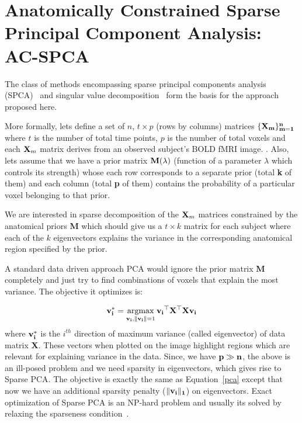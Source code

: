 \documentclass{llncs}
\newcommand{\argmax}{\operatornamewithlimits{argmax}}
\begin{document}





\section{ Anatomically Constrained Sparse Principal Component Analysis: AC-SPCA}
The class of methods encompassing sparse principal components analysis (SPCA)~\cite{zou2006sparse,Witten2009b,d2007direct} and singular value decomposition~\cite{sill2011robust} form the basis for the approach proposed here. 


More formally, lets define a set of $n$, $t\times p$ (rows by columns) matrices $\{\bf X_m\}_{m=1}^n$ where $t$ is the number of total time points, $p$ is the number of total voxels and each ${\bf X}_m$ matrix derives from an observed subject's BOLD fMRI image. .
Also, lets assume that we have a prior matrix {$\bf M(\lambda)$} (function of a parameter $\lambda$ which controls its strength) whose each row corresponds to a separate prior (total {\bf k} of them) and each column (total {\bf p} of them) contains the probability of a particular voxel belonging to that prior. 


We are interested in sparse decomposition of the ${\bf X}_m$ matrices constrained by the anatomical priors {\bf M} which should give us a $t \times k$ matrix for each subject where each of the $k$ eigenvectors explains the variance in the corresponding anatomical region specified by the prior.


A standard data driven approach PCA would ignore the prior matrix {\bf M} completely and just try to find combinations of voxels that explain the most variance. The objective it optimizes is:

\begin{equation}
{\bf v_i^*}= \argmax_{{\bf v_i},{\bf \|v_i\|}=1} {\bf v_i}^{\top}{\bf X^{\top}X}{\bf v_i}
\label{pca}
\end{equation}
where {$\bf v_i^*$} is the $i^{th}$ direction of maximum variance (called eigenvector) of data matrix {\bf X}. These vectors when plotted on the image highlight regions which are
relevant for explaining variance in the data. Since, we have ${\bf p \gg n}$, the above is an ill-posed problem and we need sparsity in eigenvectors, which gives rise to Sparse PCA. The objective is exactly the same as Equation~\ref{pca} except that now we have an additional sparsity penalty ($\|\bf v _i\|_1$) on eigenvectors.  Exact optimization of Sparse PCA is an NP-hard problem and usually its solved by relaxing the sparseness condition~\cite{zou2006sparse,Witten2009b}.
\end{document}
